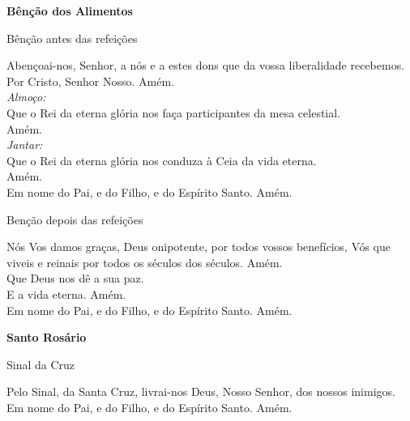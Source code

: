 \documentclass{book}
\begin{document}
\newpage
\begin{center}
    \textbf{Bênção dos Alimentos}
\end{center}
\begin{center}
    Bênção antes das refeições
\end{center}
\begin{flushleft}
    Abençoai-nos, Senhor, a nós e a estes dons que da vossa liberalidade recebemos. Por Cristo, Senhor Nosso. Amém.
    \vspace{.2cm} \\
    \textit{Almoço:} \\
    \VbarRed{} Que o Rei da eterna glória nos faça participantes da mesa celestial. \\
    \RbarRed{} Amém.
    \vspace{.2cm} \\
    \textit{Jantar:} \\
    \VbarRed{} Que o Rei da eterna glória nos conduza à Ceia da vida eterna. \\
    \RbarRed{} Amém.
    \vspace{.2cm} \\
    Em nome do Pai, \grecrossRed{} e do Filho, e do Espírito Santo. Amém.
\end{flushleft}
\begin{center}
    Benção depois das refeições
\end{center}
\begin{flushleft}
    Nós Vos damos graças, Deus onipotente, por todos vossos benefícios, Vós que viveis e reinais por todos os séculos dos séculos. Amém.
    \vspace{.2cm} \\
    \VbarRed{} Que Deus nos dê a sua paz. \\
    \RbarRed{} E a vida eterna. Amém.
    \vspace{.2cm} \\
    Em nome do Pai, \grecrossRed{} e do Filho, e do Espírito Santo. Amém.
\end{flushleft}
\newpage
\begin{center}
    \textbf{Santo Rosário}
\end{center}
\begin{center}
    Sinal da Cruz
\end{center}
\begin{flushleft}
    Pelo Sinal, \grecrossRed{} da Santa Cruz, livrai-nos Deus, \grecrossRed{} Nosso Senhor, dos nossos \grecrossRed{} inimigos. Em nome do Pai, \grecrossRed{} e do Filho, e do Espírito Santo. Amém.
\end{flushleft}
\end{document}
